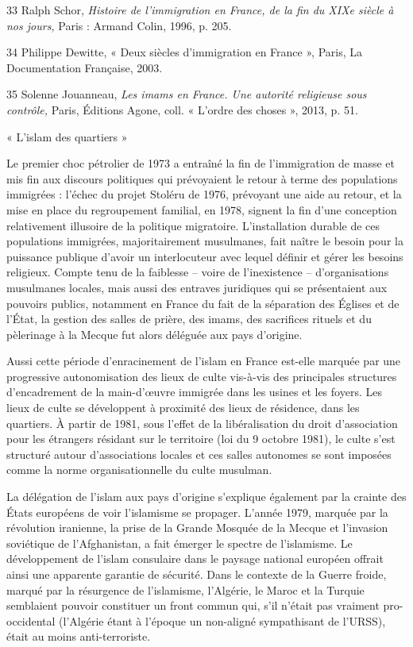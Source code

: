 33 Ralph Schor, \emph{Histoire de l'immigration en France, de la fin du
XIXe siècle à nos jours,} Paris : Armand Colin, 1996, p. 205.

34 Philippe Dewitte, « Deux siècles d'immigration en France », Paris, La
Documentation Française, 2003.

35 Solenne Jouanneau, \emph{Les imams en France. Une autorité religieuse
sous contrôle,} Paris, Éditions Agone, coll. « L'ordre des choses »,
2013, p. 51.




« L'islam des quartiers »


Le premier choc pétrolier de 1973 a entraîné la fin de l'immigration de
masse et mis fin aux discours politiques qui prévoyaient le retour à
terme des populations immigrées : l'échec du projet Stoléru de 1976,
prévoyant une aide au retour, et la mise en place du regroupement
familial, en 1978, signent la fin d'une conception relativement
illusoire de la politique migratoire. L'installation durable de ces
populations immigrées, majoritairement musulmanes, fait naître le besoin
pour la puissance publique d'avoir un interlocuteur avec lequel définir
et gérer les besoins religieux. Compte tenu de la faiblesse -- voire de
l'inexistence -- d'organisations musulmanes locales, mais aussi des
entraves juridiques qui se présentaient aux pouvoirs publics, notamment
en France du fait de la séparation des Églises et de l'État, la gestion
des salles de prière, des imams, des sacrifices rituels et du pèlerinage
à la Mecque fut alors déléguée aux pays d'origine.

Aussi cette période d'enracinement de l'islam en France est-elle marquée
par une progressive autonomisation des lieux de culte vis-à-vis des
principales structures d'encadrement de la main-d'œuvre immigrée dans
les usines et les foyers. Les lieux de culte se développent à proximité
des lieux de résidence, dans les quartiers. À partir de 1981, sous
l'effet de la libéralisation du droit d'association pour les étrangers
résidant sur le territoire (loi du 9 octobre 1981), le culte s'est
structuré autour d'associations locales et ces salles autonomes se sont
imposées comme la norme organisationnelle du culte musulman.

La délégation de l'islam aux pays d'origine s'explique également par la
crainte des États européens de voir l'islamisme se propager. L'année
1979, marquée par la révolution iranienne, la prise de la Grande Mosquée
de la Mecque et l'invasion soviétique de l'Afghanistan, a fait émerger
le spectre de l'islamisme. Le développement de l'islam consulaire dans
le paysage national européen offrait ainsi une apparente garantie de
sécurité. Dans le contexte de la Guerre froide, marqué par la résurgence
de l'islamisme, l'Algérie, le Maroc et la Turquie semblaient pouvoir
constituer un front commun qui, s'il n'était pas vraiment pro-occidental
(l'Algérie étant à l'époque un non-aligné sympathisant de l'URSS), était
au moins anti-terroriste.


